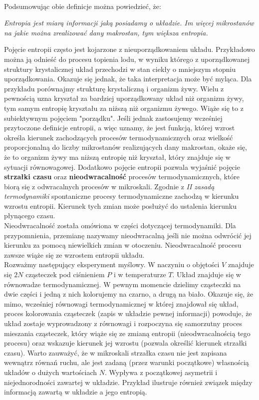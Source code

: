 \documentclass[12pt,a4paper,openright]{report} %
\begin{document}
\\
Podsumowując obie definicje można powiedzieć, że:
\begin{center}
\textit{Entropia jest miarą informacji jaką posiadamy o układzie. Im więcej mikrostanów na jakie można zrealizować dany makrostan, tym większa entropia.}
\end{center}
Pojęcie entropii często jest kojarzone z nieuporządkowaniem układu. Przykładowo można ją odnieść do procesu topienia lodu, w wyniku którego z uporządkowanej struktury krystalicznej układ przechodzi w stan ciekły o mniejszym stopniu uporządkowania. Okazuje się jednak, że taka interpretacja może być myląca. Dla przykładu porównajmy strukturę krystaliczną i organizm żywy. Wielu z pewnością uzna kryształ za bardziej uporządkowany układ niż organizm żywy, tym samym entropię kryształu za niższą niż organizmu żywego. Wiąże się to z subiektywnym pojęciem "porządku". Jeśli jednak zastosujemy wcześniej przytoczone definicje entropii, a więc uznamy, że jest funkcją, której wzrost określa kierunek zachodzących procesów termodynamicznych oraz wielkość proporcjonalną do liczby mikrostanów realizujących dany makrostan, okaże się, że to organizm żywy ma niższą entropię niż kryształ, który znajduje się w sytuacji równowagowej. 
Dodatkowo pojęcie entropii pozwala wyjaśnić pojęcie \textbf{strzałki czasu} oraz \textbf{nieodwracalność} procesów termodynamicznych, które biorą się z odwracalnych procesów w mikroskali. 
Zgodnie z \textit{II zasadą termodynamiki} spontaniczne procesy termodynamiczne zachodzą w kierunku wzrostu entropii. Kierunek tych zmian może posłużyć do ustalenia kierunku płynącego czasu. \\
Nieodwracalność została omówiona w części dotyczącej termodynamiki. Dla przypomnienia, przemianę nazywamy nieodwracalną jeśli nie można odwrócić jej kierunku za pomocą niewielkich zmian w otoczeniu. Nieodwracalność procesu zawsze wiąże się ze wzrostem entropii układu. \\
Rozważmy następujący eksperyment myślowy. W naczyniu o objętości $V$ znajduje się $2N$ cząsteczek pod ciśnieniem $P$ i w temperaturze $T$. Układ znajduje się w równowadze termodynamicznej. W pewnym momencie dzielimy cząsteczki na dwie części i jedną z nich kolorujemy na czarno, a drugą na biało. Okazuje się, że mimo, wcześniej równowagi termodynamicznej w której znajdował się układ, proces kolorowania cząsteczek (zapis w układzie pewnej informacji) powoduje, że układ zostaje wyprowadzony z równowagi i rozpoczyna się samorzutny proces mieszania cząsteczek, który wiąże się ze zmianą entropii (nieodwracalnością tego procesu) oraz wskazuje kierunek jej wzrostu (pozwala określić kierunek strzałki czasu). Warto zauważyć, że w mikroskali strzałka czasu nie jest zapisana wewnątrz równań ruchu, ale jest zadaną (przez warunki początkowe) własnością układów o dużych wartościach $N$. Wypływa z początkowej asymetrii i niejednorodności zawartej w układzie. Przykład ilustruje również związek między informacją zawartą w układzie a jego entropią.
\end{document}
